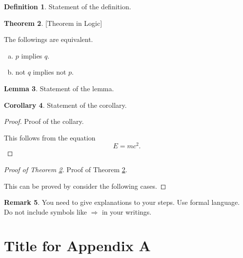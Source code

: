 \documentclass[12pt]{article}
\theoremstyle{definition}
\newtheorem{theorem}{Theorem}[section]
\newtheorem{lemma}[theorem]{Lemma}
\newtheorem{corollary}[theorem]{Corollary}
\newtheorem{definition}[theorem]{Definition}
\newtheorem{remark}[theorem]{Remark}
\numberwithin{equation}{section}
\begin{document}
\begin{definition}
	Statement of the definition.
\end{definition}

\begin{theorem}\label{thm.1}[Theorem in Logic]\leavevmode

The followings are equivalent.	 
\begin{enumerate}[(a)]
\item $p$ implies $q$.
\item not $q$ implies not $p$.
\end{enumerate}
\end{theorem}

\begin{lemma}
	Statement of the lemma.
\end{lemma}

\begin{corollary}
	Statement of the corollary.
\end{corollary}

\begin{proof}
	Proof of the collary.
	
	This follows from the equation
	\begin{equation}\label{eq2}
	E=mc^2.\end{equation}
\end{proof}


\begin{proof}[Proof of Theorem \ref{thm.1}]
	Proof of Theorem \ref{thm.1}.
	
	This can be proved by consider the following cases.
\end{proof}

\begin{remark}
You need to give explanations to your steps. Use formal language. Do not include symbols like $\Rightarrow$ in your writings. 
\end{remark}

 \vfill\pagebreak



 





 
\appendix
%
\section{Title for Appendix A}
\end{document}
